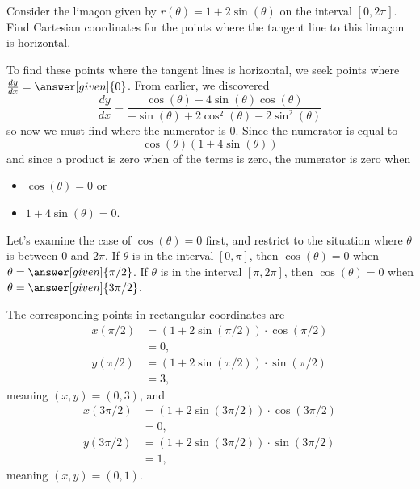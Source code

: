 \documentclass{ximera}
\begin{document}
\begin{example}
  Consider the lima\c{c}on given by $r(\theta) =1+2\sin(\theta)$ on the
  interval $[0,2\pi]$.  Find Cartesian coordinates for the points
  where the tangent line to this lima\c{c}on is horizontal.
\begin{explanation}
  To find these points where the tangent lines is horizontal, we seek
  points where $\frac{dy}{dx} = \answer[given]{0}$.  From earlier, we discovered
  \[
  \frac{dy}{dx} =\frac{\cos(\theta) + 4\sin(\theta)\cos(\theta)}{-\sin(\theta) + 2\cos^2(\theta)-2\sin^2(\theta)}
  \]
  so now we must find where the numerator is $0$. Since the numerator is equal to
  \[
  \cos(\theta)(1+ 4\sin(\theta))
  \]
  and since a product is zero when  of the terms is zero,
  the numerator is zero when 
  \begin{itemize}
  \item $\cos(\theta)=0$ or
  \item $1+4\sin(\theta)=0$.
  \end{itemize}

  Let's examine the case of $\cos(\theta) = 0$ first, and restrict to the situation where $\theta$ is between $0$ and $2\pi$.
  If $\theta$ is in the interval $[0,\pi]$, then $\cos(\theta)=0$ when $\theta=\answer[given]{\pi/2}$.
  If $\theta$ is in the interval $[\pi,2\pi]$, then $\cos(\theta)=0$ when $\theta=\answer[given]{3\pi/2}$.

  The corresponding points in rectangular coordinates are
  \begin{align*}
    x(\pi/2) &= \left(1+2\sin(\pi/2)\right)\cdot\cos(\pi/2)\\
    &= 0,\\
    y(\pi/2) &= \left(1+2\sin(\pi/2)\right)\cdot\sin(\pi/2)\\
    &= 3,
  \end{align*}
  meaning $(x,y) = (0,3)$, and
  \begin{align*}
    x(3\pi/2) &= \left(1+2\sin(3\pi/2)\right)\cdot\cos(3\pi/2)\\
    &= 0,\\
    y(3\pi/2) &= \left(1+2\sin(3\pi/2)\right)\cdot\sin(3\pi/2)\\
    &= 1,
  \end{align*}
  meaning $(x,y) = (0,1)$.


\end{explanation}
\end{example}
\end{document}
